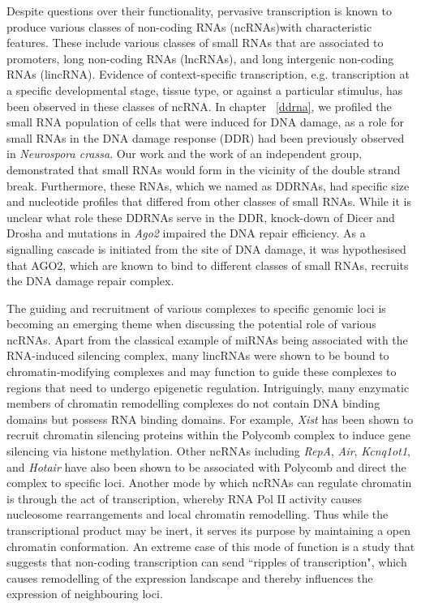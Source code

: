 Despite questions over their functionality, pervasive transcription is known to produce various classes of non-coding RNAs (ncRNAs)with characteristic features. These include various classes of small RNAs that are associated to promoters\cite{pmid19920851}, long non-coding RNAs (lncRNAs)\cite{pmid24290031}, and long intergenic non-coding RNAs (lincRNA)\cite{pmid23818866}. Evidence of context-specific transcription, e.g. transcription at a specific developmental stage, tissue type, or against a particular stimulus, has been observed in these classes of ncRNA. In chapter ~\ref{ddrna}, we profiled the small RNA population of cells that were induced for DNA damage, as a role for small RNAs in the DNA damage response (DDR) had been previously observed in \textit{Neurospora crassa}\cite{pmid19444217}. Our work and the work of an independent group, demonstrated that small RNAs would form in the vicinity of the double strand break\cite{francia2012site,pmid22445173}. Furthermore, these RNAs, which we named as DDRNAs, had specific size and nucleotide profiles that differed from other classes of small RNAs. While it is unclear what role these DDRNAs serve in the DDR, knock-down of Dicer and Drosha\cite{francia2012site} and mutations in \textit{Ago2}\cite{pmid22445173} impaired the DNA repair efficiency. As a signalling cascade is initiated from the site of DNA damage\cite{pmid19847258}, it was hypothesised that AGO2, which are known to bind to different classes of small RNAs, recruits the DNA damage repair complex\cite{pmid22445173}.

The guiding and recruitment of various complexes to specific genomic loci is becoming an emerging theme when discussing the potential role of various ncRNAs. Apart from the classical example of miRNAs being associated with the RNA-induced silencing complex, many lincRNAs were shown to be bound to chromatin-modifying complexes and may function to guide these complexes to regions that need to undergo epigenetic regulation\cite{pmid21915889,pmid19571010}. Intriguingly, many enzymatic members of chromatin remodelling complexes do not contain DNA binding domains but possess RNA binding domains. For example, \textit{Xist} has been shown to recruit chromatin silencing proteins within the Polycomb complex to induce gene silencing via histone methylation\cite{pmid17869504}. Other ncRNAs including \textit{RepA}, \textit{Air}, \textit{Kcnq1ot1}, and \textit{Hotair} have also been shown to be associated with Polycomb and direct the complex to specific loci\cite{pmid21915889}. Another mode by which ncRNAs can regulate chromatin is through the act of transcription, whereby RNA Pol II activity causes nucleosome rearrangements and local chromatin remodelling\cite{pmid16094312}. Thus while the transcriptional product may be inert, it serves its purpose by maintaining a open chromatin conformation. An extreme case of this mode of function is a study that suggests that non-coding transcription can send ``ripples of transcription", which causes remodelling of the expression landscape and thereby influences the expression of neighbouring loci\cite{pmid19160492}.

